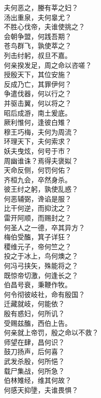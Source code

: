 \documentclass[]{article}
\begin{document}
夫何恶之，媵有莘之妇？\\
汤出重泉，夫何辠尤？\\
不胜心伐帝，夫谁使挑之？\\
会朝争盟，何践吾期？\\
苍鸟群飞，孰使萃之？\\
列击纣躬，叔旦不嘉。\\
何亲揆发足，周之命以咨嗟？\\
授殷天下，其位安施？\\
反成乃亡，其罪伊何？\\
争遣伐器，何以行之？\\
并驱击翼，何以将之？\\
昭后成游，南土爰底。\\
厥利惟何，逢彼白雉？\\
穆王巧梅，夫何为周流？\\
环理天下，夫何索求？\\
妖夫曳炫，何号于市？\\
周幽谁诛？焉得夫褒姒？\\
天命反侧，何罚何佑？\\
齐桓九会，卒然身杀。\\
彼王纣之躬，孰使乱惑？\\
何恶辅弼，谗谄是服？\\
比干何逆，而抑沈之？\\
雷开阿顺，而赐封之？\\
何圣人之一德，卒其异方？\\
梅伯受醢，箕子详狂？\\
稷维元子，帝何竺之？\\
投之于冰上，鸟何燠之？\\
何冯弓挟矢，殊能将之？\\
既惊帝切激，何逢长之？\\
伯昌号衰，秉鞭作牧。\\
何令彻彼岐社，命有殷国？\\
迁藏就岐，何能依？\\
殷有惑妇，何所讥？\\
受赐兹醢，西伯上告。\\
何亲就上帝罚，殷之命以不救？\\
师望在肆，昌何识？\\
鼓刀扬声，后何喜？\\
武发杀殷，何所悒？\\
载尸集战，何所急？\\
伯林雉经，维其何故？\\
何感天抑墬，夫谁畏惧？\\
\end{document}

